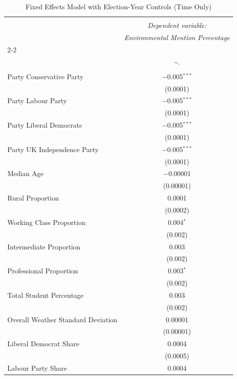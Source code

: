 \documentclass[preprint,12pt,authoryear]{elsarticle}
\begin{document}
\begin{table}[!htbp] \centering
	\caption{Fixed Effects Model with Election-Year Controls (Time Only)}
	\label{tab:time_only_fe}
	\footnotesize %
	\setlength{\tabcolsep}{4pt} %
	\renewcommand{\arraystretch}{0.9} %
\begin{tabular}{@{\extracolsep{5pt}}lc}
\\[-1.8ex]\hline
\hline \\[-1.8ex]
 & \multicolumn{1}{c}{\textit{Dependent variable:}} \\
 & \multicolumn{1}{c}{\textit{Environmental Mention Percentage}} \\
\cline{2-2}
\\[-1.8ex] & \textasciitilde . \\
\hline \\[-1.8ex]
 Party Conservative Party & $-$0.005$^{***}$ \\
	& (0.0001) \\
 Party Labour Party & $-$0.005$^{***}$ \\
	& (0.0001) \\
 Party Liberal Democrats & $-$0.005$^{***}$ \\
	& (0.0001) \\
 Party UK Independence Party & $-$0.005$^{***}$ \\
	& (0.0001) \\
 Median Age & $-$0.00001 \\
	& (0.00001) \\ 
 Rural Proportion & 0.0001 \\
	& (0.0002) \\
 Working Class Proportion & 0.004$^{*}$ \\
	& (0.002) \\
 Intermediate Proportion & 0.003 \\
	& (0.002) \\
 Professional Proportion & 0.003$^{*}$ \\
	& (0.002) \\
 Total Student Percentage & 0.003 \\
	& (0.002) \\
 Overall Weather Standard Deviation & 0.00001 \\
	& (0.00001) \\
 Liberal Democrat Share & 0.0004 \\ 
	& (0.0005) \\
 Labour Party Share & 0.0004 \\

\end{tabular}
\end{table}
\end{document}
